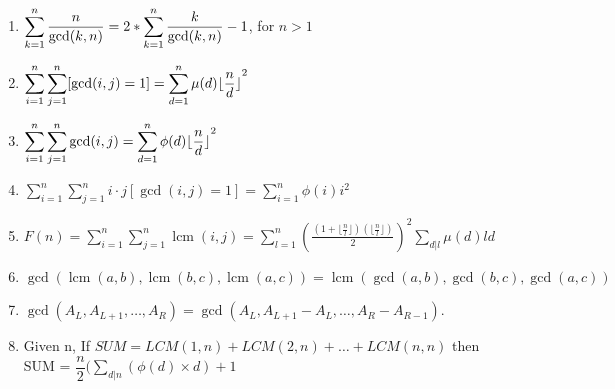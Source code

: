 \begin{enumerate}[resume]
    \item $\displaystyle \displaystyle \sum_{k=1}^n \frac{n}{\gcd(k, n)} = 2 * \displaystyle \sum_{k=1}^n \frac{k}{\gcd(k, n)} - 1$, for $n > 1$
    \item $\displaystyle \displaystyle \sum_{i=1}^n \sum_{j=1}^n [\gcd(i, j) = 1] = \displaystyle \sum_{d=1}^n \mu(d) \lfloor {\frac{n}{d} \rfloor}^2$
    \item $\displaystyle \displaystyle \sum_{i=1}^n \displaystyle\sum_{j=1}^n \gcd(i, j) = \displaystyle \sum_{d=1}^n \phi(d) \lfloor {\frac{n}{d} \rfloor}^2$
    \item $\displaystyle \sum_{i=1}^n \sum_{j=1}^n i \cdot j[\gcd(i, j) = 1] = \sum_{i=1}^n \phi(i)i^2$
    \item $\displaystyle F(n) = \displaystyle \sum_{i=1}^n \displaystyle \sum_{j=1}^n \operatorname{lcm}(i, j) = \displaystyle \sum_{l=1}^n {\left(\frac{\left( 1 + \lfloor{\frac{n}{l} \rfloor} \right) \left( \lfloor{\frac{n}{l} \rfloor} \right)} {2} \right)}^2 \displaystyle \sum_{d|l} \mu(d)ld$
    \item $\displaystyle \gcd(\operatorname{lcm}(a, b), \operatorname{lcm}(b, c), \operatorname{lcm}(a, c)) = \operatorname{lcm}(\gcd(a, b), \gcd(b, c), \gcd(a, c))$
    \item $\displaystyle \gcd(A_L, A_{L+1}, \dots, A_R) = \gcd(A_L, A_{L+1} - A_L, \dots, A_R - A_{R-1})$.
    \item Given n, If $SUM = LCM(1,n) + LCM(2,n) + \dots + LCM(n,n)$
    then SUM = $\displaystyle \dfrac{n}{2}( \displaystyle\sum _{ d| n}\left( \phi \left( d\right) \times d\right) +1$
  \end{enumerate}
